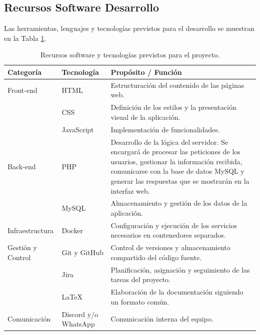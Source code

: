 \subsection{Recursos Software Desarrollo}

Las herramientas, lenguajes y tecnologías previstos para el desarrollo se muestran en la Tabla \ref{tab:recursos_software}.
 
\begin{table}[H]
\centering
\small
{}
\begin{tabularx}{\textwidth}{l l X}
\toprule
\rowcolor{azulPastelApagado}
\textbf{Categoría} & \textbf{Tecnología} & \textbf{Propósito / Función} \\
\midrule
Front-end & HTML & Estructuración del contenido de las páginas web. \\
          & CSS & Definición de los estilos y la presentación visual de la aplicación. \\
          & JavaScript & Implementación de funcionalidades. \\
Back-end  & PHP & Desarrollo de la lógica del servidor. Se encargará de procesar las peticiones de los usuarios, gestionar la información recibida, comunicarse con la base de datos MySQL y generar las respuestas que se mostrarán en la interfaz web. \\
          & MySQL & Almacenamiento y gestión de los datos de la aplicación. \\
Infraestructura & Docker & Configuración y ejecución de los servicios necesarios en contenedores separados. \\
Gestión y Control & Git y GitHub & Control de versiones y almacenamiento compartido del código fuente. \\
                  & Jira & Planificación, asignación y seguimiento de las tareas del proyecto. \\
                  & \LaTeX & Elaboración de la documentación siguiendo un formato común. \\
Comunicación & Discord y/o WhatsApp & Comunicación interna del equipo. \\
\bottomrule
\end{tabularx}
\caption{Recursos software y tecnologías previstos para el proyecto.}
\label{tab:recursos_software}
\end{table}

